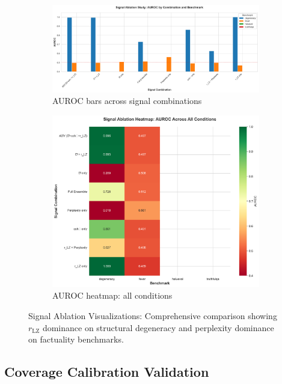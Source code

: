 \documentclass[11pt]{article}
\begin{document}
\begin{figure}[h]
\centering
\begin{subfigure}[b]{0.48\textwidth}
\includegraphics[width=\textwidth]{figures/ablation_auroc.png}
\caption{AUROC bars across signal combinations}
\end{subfigure}
\hfill
\begin{subfigure}[b]{0.48\textwidth}
\includegraphics[width=\textwidth]{figures/ablation_heatmap.png}
\caption{AUROC heatmap: all conditions}
\end{subfigure}
\caption{Signal Ablation Visualizations: Comprehensive comparison showing $r_{\text{LZ}}$ dominance on structural degeneracy and perplexity dominance on factuality benchmarks.}
\label{fig:ablation-visualizations}
\end{figure}

\subsection{Coverage Calibration Validation}
\label{sec:validation-coverage}
\end{document}
